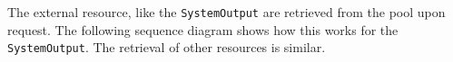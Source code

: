 \documentclass[11pt,a4paper]{article}
\begin{document}
The external resource, like the \texttt{SystemOutput} are retrieved from the 
pool upon request. The following sequence diagram shows how this works for
the \texttt{SystemOutput}. The retrieval of other resources is similar.

\begin{center}
\end{center}
\end{document}

